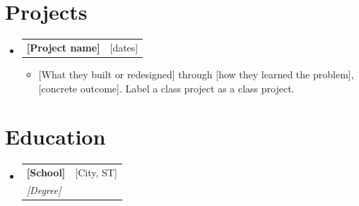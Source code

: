 \documentclass[letterpaper,10.9pt]{article}
\makeatletter
\newcommand{\resumeItem}[1]{
  \item\small{
    {#1 \vspace{-2pt}}
  }
}
\newcommand{\resumeSubheading}[4]{
  \vspace{-2pt}\item
    \begin{tabular*}{0.97\textwidth}[t]{l@{\extracolsep{\fill}}r}
      \textbf{#1} & #2 \\
      \textit{\small#3} & \textit{\small #4} \\
    \end{tabular*}\vspace{-7pt}
}
\newcommand{\resumeProjectHeading}[2]{
    \item
    \begin{tabular*}{0.97\textwidth}{l@{\extracolsep{\fill}}r}
      \small#1 & #2 \\
    \end{tabular*}\vspace{-7pt}
}
\newcommand{\resumeSubHeadingListStart}{\begin{itemize}[leftmargin=0.15in, label={}]}
\newcommand{\resumeSubHeadingListEnd}{\end{itemize}}
\newcommand{\resumeItemListStart}{\begin{itemize}}
\newcommand{\resumeItemListEnd}{\end{itemize}\vspace{-5pt}}
\makeatother
\begin{document}
\section{Projects}
    \resumeSubHeadingListStart
      \resumeProjectHeading
          {\textbf{[Project name]}}{[dates]}
          \resumeItemListStart
            \resumeItem{[What they built or redesigned] through [how they learned the problem], [concrete outcome]. Label a class project as a class project.}
          \resumeItemListEnd
  \resumeSubHeadingListEnd

\section{Education}
  \resumeSubHeadingListStart
    \resumeSubheading
      {[School]}{[City, ST]}
      {[Degree]}{}
  \resumeSubHeadingListEnd
\end{document}
